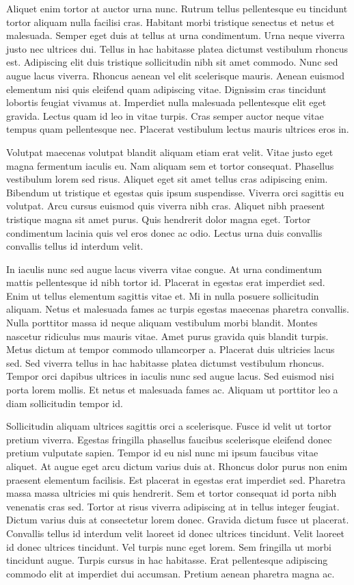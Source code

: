 \documentclass[11pt,a4paper]{article}
\begin{document}
Aliquet enim tortor at auctor urna nunc. Rutrum tellus pellentesque eu tincidunt tortor aliquam nulla facilisi cras. Habitant morbi tristique senectus et netus et malesuada. Semper eget duis at tellus at urna condimentum. Urna neque viverra justo nec ultrices dui. Tellus in hac habitasse platea dictumst vestibulum rhoncus est. Adipiscing elit duis tristique sollicitudin nibh sit amet commodo. Nunc sed augue lacus viverra. Rhoncus aenean vel elit scelerisque mauris. Aenean euismod elementum nisi quis eleifend quam adipiscing vitae. Dignissim cras tincidunt lobortis feugiat vivamus at. Imperdiet nulla malesuada pellentesque elit eget gravida. Lectus quam id leo in vitae turpis. Cras semper auctor neque vitae tempus quam pellentesque nec. Placerat vestibulum lectus mauris ultrices eros in.

Volutpat maecenas volutpat blandit aliquam etiam erat velit. Vitae justo eget magna fermentum iaculis eu. Nam aliquam sem et tortor consequat. Phasellus vestibulum lorem sed risus. Aliquet eget sit amet tellus cras adipiscing enim. Bibendum ut tristique et egestas quis ipsum suspendisse. Viverra orci sagittis eu volutpat. Arcu cursus euismod quis viverra nibh cras. Aliquet nibh praesent tristique magna sit amet purus. Quis hendrerit dolor magna eget. Tortor condimentum lacinia quis vel eros donec ac odio. Lectus urna duis convallis convallis tellus id interdum velit.

In iaculis nunc sed augue lacus viverra vitae congue. At urna condimentum mattis pellentesque id nibh tortor id. Placerat in egestas erat imperdiet sed. Enim ut tellus elementum sagittis vitae et. Mi in nulla posuere sollicitudin aliquam. Netus et malesuada fames ac turpis egestas maecenas pharetra convallis. Nulla porttitor massa id neque aliquam vestibulum morbi blandit. Montes nascetur ridiculus mus mauris vitae. Amet purus gravida quis blandit turpis. Metus dictum at tempor commodo ullamcorper a. Placerat duis ultricies lacus sed. Sed viverra tellus in hac habitasse platea dictumst vestibulum rhoncus. Tempor orci dapibus ultrices in iaculis nunc sed augue lacus. Sed euismod nisi porta lorem mollis. Et netus et malesuada fames ac. Aliquam ut porttitor leo a diam sollicitudin tempor id.

Sollicitudin aliquam ultrices sagittis orci a scelerisque. Fusce id velit ut tortor pretium viverra. Egestas fringilla phasellus faucibus scelerisque eleifend donec pretium vulputate sapien. Tempor id eu nisl nunc mi ipsum faucibus vitae aliquet. At augue eget arcu dictum varius duis at. Rhoncus dolor purus non enim praesent elementum facilisis. Est placerat in egestas erat imperdiet sed. Pharetra massa massa ultricies mi quis hendrerit. Sem et tortor consequat id porta nibh venenatis cras sed. Tortor at risus viverra adipiscing at in tellus integer feugiat. Dictum varius duis at consectetur lorem donec. Gravida dictum fusce ut placerat. Convallis tellus id interdum velit laoreet id donec ultrices tincidunt. Velit laoreet id donec ultrices tincidunt. Vel turpis nunc eget lorem. Sem fringilla ut morbi tincidunt augue. Turpis cursus in hac habitasse. Erat pellentesque adipiscing commodo elit at imperdiet dui accumsan. Pretium aenean pharetra magna ac.
\end{document}

